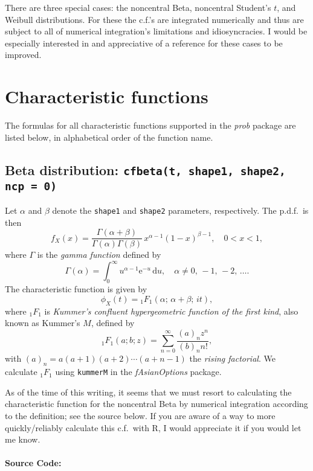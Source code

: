 \documentclass[english]{article}
\newcommand{\Rpackage}[1]{{\textit{#1}}}
\newcommand{\me}{\mathrm{e}}
\renewcommand{\d}{\mathrm{d}}
\begin{document}
There are three special cases: the noncentral Beta, noncentral Student's
$t$, and Weibull distributions. For these the c.f.'s are integrated
numerically and thus are subject to all of numerical integration's
limitations and idiosyncracies. I would be especially interested in
and appreciative of a reference for these cases to be improved.


\section{Characteristic functions}

The formulas for all characteristic functions supported in the \Rpackage{prob}
package are listed below, in alphabetical order of the function name.


\subsection{Beta distribution: \texttt{cfbeta(t, shape1, shape2, ncp = 0)}\label{sub:Beta-distribution}}

Let $\alpha$ and $\beta$ denote the \texttt{shape1} and \texttt{shape2}
parameters, respectively. The p.d.f.~is then\[
f_{X}(x)=\frac{\Gamma(\alpha+\beta)}{\Gamma(\alpha)\Gamma(\beta)}\, x^{\alpha-1}(1-x)^{\beta-1},\quad0<x<1,\]
where $\Gamma$ is the \emph{gamma function} defined by\[
\Gamma(\alpha)=\int_{0}^{\infty}u^{\alpha-1}\me^{-u}\,\d u,\quad\alpha\neq0,\,-1,\,-2,\,\ldots.\]
The characteristic function is given by\[
\phi_{X}(t)={}_{1}F_{1}(\alpha;\,\alpha+\beta;\, it),\]
where $_{1}F_{1}$ is \emph{Kummer's confluent hypergeometric function
of the first kind}, also known as Kummer's $M$, defined by \[
_{1}F_{1}(a;b;z)=\sum_{n=0}^{\infty}\frac{(a)_{n}z^{n}}{(b)_{n}n!},\]
with $(a)_{n}=a(a+1)(a+2)\cdots(a+n-1)$ the \emph{rising factorial}.
We calculate $_{1}F_{1}$ using \texttt{kummerM} in the \Rpackage{fAsianOptions}
package. 

As of the time of this writing, it seems that we must resort to calculating
the characteristic function for the noncentral Beta by numerical integration
according to the definition; see the source below. If you are aware
of a way to more quickly/reliably calculate this c.f.~with \textsf{R},
I would appreciate it if you would let me know.


\paragraph*{Source Code:}
\end{document}
